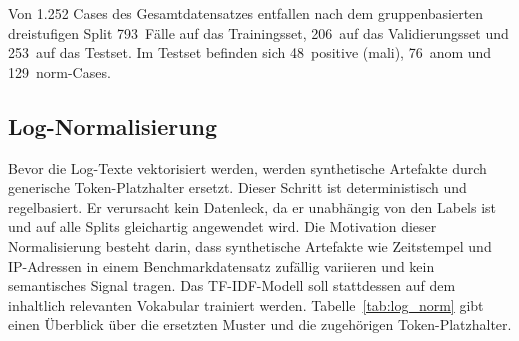 Von 1.252 Cases des Gesamtdatensatzes entfallen nach dem gruppenbasierten dreistufigen Split 793~Fälle auf das Trainingsset, 206~auf das Validierungsset und 253~auf das Testset. Im Testset befinden sich 48~positive (mali), 76~anom und 129~norm-Cases.

\subsection{Log-Normalisierung}

Bevor die Log-Texte vektorisiert werden, werden synthetische Artefakte durch generische Token-Platzhalter ersetzt. Dieser Schritt ist deterministisch und regelbasiert. Er verursacht kein Datenleck, da er unabhängig von den Labels ist und auf alle Splits gleichartig angewendet wird. Die Motivation dieser Normalisierung besteht darin, dass synthetische Artefakte wie Zeitstempel und IP-Adressen in einem Benchmarkdatensatz zufällig variieren und kein semantisches Signal tragen. Das TF-IDF-Modell soll stattdessen auf dem inhaltlich relevanten Vokabular trainiert werden. Tabelle~\ref{tab:log_norm} gibt einen Überblick über die ersetzten Muster und die zugehörigen Token-Platzhalter.

\begin{table}[H]
  \centering
  \caption{Regelbasierte Log-Normalisierung}
  \label{tab:log_norm}
\end{table}

